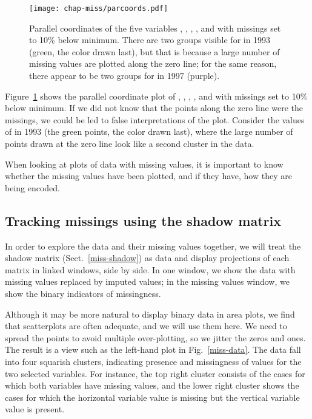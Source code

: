 \begin{figure}[htb]
\centerline{\texttt{[image: chap-miss/parcoords.pdf]}}
\caption[Parallel coordinates plot with missings set to 10\% below
minimum]{Parallel coordinates of the five variables , , , , and
 with missings set to 10\% below minimum. There are two
groups visible for  in 1993 (green, the color drawn
last), but that is because a large number of missing values are
plotted along the zero line; for the same reason, there appear to be
two groups for  in 1997 (purple).  }
\label{missing3}
\end{figure}

Figure~\ref{missing3} shows the parallel coordinate plot of , , ,
, and  with missings set to 10\% below minimum.
If we did not know that the points along the zero line were the
missings, we could be led to false interpretations of the plot.
Consider the values of  in 1993 (the green points, the
color drawn last), where the large number of points drawn at the zero
line look like a second cluster in the data.


When looking at plots of data with missing values, it is important to
know whether the missing values have been plotted, and if they have,
how they are being encoded.

\subsection{Tracking missings using the shadow matrix}

In order to explore the data and their missing values together, we
will treat the shadow matrix (Sect.~\ref{miss-shadow}) as data and
display projections of each matrix in linked windows, side by side.
In one window, we show the data with missing values replaced by
imputed values; in the missing values window, we show the binary
indicators of missingness.

Although it may be more natural to display binary data in area plots,
we find that scatterplots are often adequate, and we will use them
here.  We need to spread the points to avoid multiple over-plotting,
so we jitter the zeros and ones.  The result is a view such as the
left-hand plot in Fig.~\ref{miss-data}.  The data fall into four
squarish clusters, indicating presence and missingness of values
for the two selected variables.  For instance, the top right cluster
consists of the cases for which both variables have missing values,
and the lower right cluster shows the cases for which the horizontal
variable value is missing but the vertical variable value is present.

